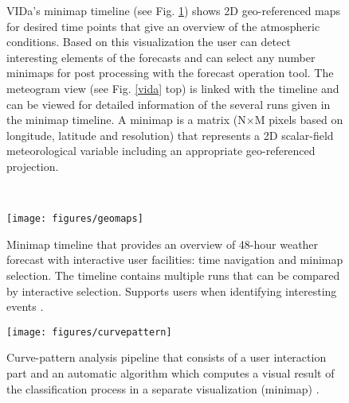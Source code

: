 \documentclass[citeauthoryear]{llncs}
\begin{document}
\begin{figure}[h!]
	\vspace*{-0.9cm}	
	\begin{minipage}[t]{4.6cm}		
		\vspace*{0.03cm}
		VIDa's minimap timeline (see Fig. \ref{geomaps}) shows 2D geo-referenced maps for desired time points that give an overview of the atmospheric conditions. Based on this visualization the user can detect interesting elements of the forecasts and can select any number minimaps for post processing with the forecast operation tool. The meteogram view (see Fig. \ref{vida} top) is linked with the timeline and can be viewed for detailed information of the several runs given in the minimap timeline. A minimap is a matrix (N$\times$M pixels based on longitude, latitude and resolution) that represents a 2D scalar-field meteorological variable including an appropriate geo-referenced projection.
	\end{minipage}
	~
	\begin{minipage}[t]{7.4cm}
		\vspace{0.1cm}
		\centering
		\texttt{[image: figures/geomaps]} 
		\caption{{\small Minimap timeline that provides an overview of 48-hour weather forecast with interactive user facilities: time navigation and minimap selection. The timeline contains multiple runs that can be compared by interactive selection. Supports users when identifying interesting events \cite{diehl2015visual}. \label{geomaps}}}
	\end{minipage}
	\vspace*{-0.5cm}
\end{figure}
\begin{figure}[b!]
	\vspace*{-0.5cm}
	\centering	
	\texttt{[image: figures/curvepattern]} 
	\caption{{\small Curve-pattern analysis pipeline that consists of a user interaction part and an automatic algorithm which computes a visual result of the classification process in a separate visualization (minimap) \cite{diehl2015visual}. \label{curvepattern}}}
	\vspace*{-0.5cm}
\end{figure}
\end{document}
